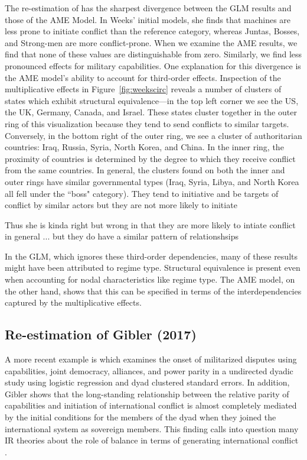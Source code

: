 The re-estimation of \citet{weeks:2012} has the sharpest divergence between the GLM results and those of the AME Model. In Weeks' initial models,  she finds that machines are less prone to initiate conflict than the reference category, whereas Juntas, Bosses, and Strong-men are more conflict-prone. When we examine the AME results, we find that none of these values are distinguishable from zero. Similarly, we find less pronounced effects for military capabilities. One explanation for this divergence is the AME model's ability to account for third-order effects. Inspection of the multiplicative effects in Figure~\ref{fig:weekscirc} reveals a number of clusters of states which exhibit structural equivalence---in the top left corner we see the US, the UK, Germany, Canada, and Israel. These states cluster together in the outer ring of this visualization because they tend to send conflicts to similar targets. Conversely, in the bottom right of the outer ring, we see a cluster of authoritarian countries: Iraq, Russia, Syria, North Korea, and China. In the inner ring, the proximity of countries is determined by the degree to which they receive conflict from the same countries. In general, the clusters found on both the inner and outer rings have similar governmental types (Iraq, Syria, Libya, and North Korea all fell under the ``boss" category). They tend to initiative and be targets of conflict by similar actors but they are not more likely to initiate 

Thus she is kinda right but wrong in that they are more likely to intiate conflict in general ... but they do have a similar pattern of relationshsips

In the GLM, which ignores these third-order dependencies, many of these results might have been attributed to regime type. Structural equivalence is present even when accounting for nodal characteristics like regime type.  The AME model, on the other hand, shows that this can be specified in terms of the interdependencies captured by the multiplicative effects. 

\subsection{Re-estimation of Gibler (2017)}

A more recent example is \citet{gibler:2017} which examines the onset of militarized disputes using capabilities, joint democracy, alliances, and power parity in a undirected dyadic study using logistic regression and dyad clustered standard errors. In addition, Gibler shows that the long-standing relationship between the relative parity of capabilities and initiation of international conflict is almost completely mediated by the initial conditions for the members of the dyad when they joined the international system as sovereign members. This finding calls into question many IR theories about the role of balance in terms of generating international conflict \citep{organski:1958}.

